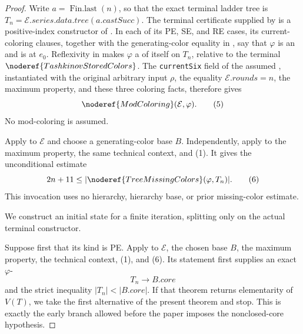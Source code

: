 \begin{proof}
Write \(a=\operatorname{Fin.last}(n)\), so that the exact terminal ladder
tree is \(T_n=\mathcal E.\mathit{series.data.tree}(a.\mathit{castSucc})\).
The terminal certificate supplied by  is a
positive-index constructor of .  In each of
its PE, SE, and RE cases, its current-coloring clauses, together with the
generating-color equality in , say that
\(\varphi\) is an  and is
 at \(e_0\).  Reflexivity in 
makes \(\varphi\) a  of itself on \(T_n\), relative
to the terminal \(\noderef{TashkinovStoredColors}\).  The
\texttt{currentSix} field of the assumed
, instantiated with the original
arbitrary input \(\rho\), the equality \(\mathcal E.\mathit{rounds}=n\),
the maximum property, and these three coloring facts, therefore gives
\[
                       \noderef{ModColoring}(\mathcal E,\varphi). \tag{5}
\]
No mod-coloring is assumed.

Apply  to \(\mathcal E\) and choose a
generating-color base \(B\).  Independently, apply
 to the maximum property,
the same technical context, and (1).  It gives the unconditional estimate
\[
                       2n+11\leq
       |\noderef{TreeMissingColors}(\varphi,T_n)|.               \tag{6}
\]
This invocation uses no hierarchy, hierarchy base, or prior missing-color
estimate.

We construct an initial state for a finite iteration, splitting only on the
actual terminal constructor.

Suppose first that its kind is PE.  Apply
 to \(\mathcal E\), the chosen
base \(B\), the maximum property, the technical context, (1), and (6).  Its
statement first supplies an exact \(\varphi\)-
\[
                         T_n\longrightarrow B.\mathit{core}      \tag{7}
\]
and the strict inequality
\(|T_n|<|B.\mathit{core}|\).  If that theorem returns elementarity of
\(V(T)\), we take the first alternative of the present theorem and stop.
This is exactly the early branch allowed before the paper imposes the
nonclosed-core hypothesis.


\end{proof}
